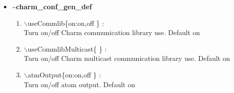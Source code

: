 \documentclass[12pt]{article}
\begin{document}
\begin{itemize}
\clearpage
\huge
\item []{\bf \~{ }charm\_conf\_gen\_def}
\begin{enumerate}
  \vspace{0.15in} \Large
  \item  $\backslash$useCommlib\{on:on,off \} : \\   \large
  Turn on/off Charm communication library use. Default on
  \vspace{0.15in} \Large
  \item  $\backslash$useCommlibMulticast\{ \} : \\   \large
  \vspace{0.15in} \Large
  Turn on/off Charm multicast communication library use. Default on
  \item  $\backslash$atmOutput\{on:on,off \} : \\   \large
  Turn on/off atom output. Default on
\end{enumerate}


\end{itemize}
\end{document}
